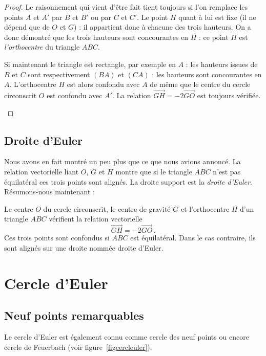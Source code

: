 \begin{proof}
Le raisonnement qui vient d'être fait tient toujours si l'on remplace les points $A$ et $A'$ par $B$ et $B'$ ou par $C$ et $C'$. Le point $H$ quant à lui est fixe (il ne dépend que de $O$ et $G$) : il appartient donc à chacune des trois hauteurs. On a donc démontré que les trois hauteurs sont concourantes en $H$ : ce point $H$ est \emph{l'orthocentre} du triangle $ABC$.
\begin{alert}
Si maintenant le triangle est rectangle, par exemple en $A$ : les hauteurs issues de $B$ et $C$ sont respectivement $(BA)$ et $(CA)$ : les hauteurs sont concourantes en $A$. L'orthocentre $H$ est alors confondu avec $A$ de même que le centre du cercle circonscrit  $O$ est confondu avec $A'$. La relation $\overrightarrow{GH} = -2\overrightarrow{GO}$ est toujours vérifiée.\qedhere
\end{alert}
\end{proof}
\subsection{Droite d'Euler}



Nous avons en fait montré un peu plus que ce que nous avions annoncé. 
La relation vectorielle liant $O$, $G$ et $H$ montre que si le triangle $ABC$ n'est pas équilatéral ces trois points sont alignés. La droite support est la \emph{droite d'Euler}. Résumons-nous maintenant :
\begin{thm}
Le centre $O$ du cercle circonscrit, le centre de gravité $G$ et l'orthocentre $H$ d'un triangle $ABC$ vérifient la relation vectorielle 
\begin{equation}\overrightarrow{GH}=-2\overrightarrow{GO}\,.\label{eulerposition}\end{equation}
Ces trois points sont confondus si $ABC$ est équilatéral. Dans le cas contraire, ils sont alignés sur une droite nommée droite d'Euler. 
\label{eulerprecis}
\end{thm}

\section{Cercle d'Euler}
\subsection{Neuf points remarquables}
Le cercle d'Euler est également connu comme cercle des neuf points ou encore cercle de Feuerbach (voir figure \ref{figcercleuler}).

